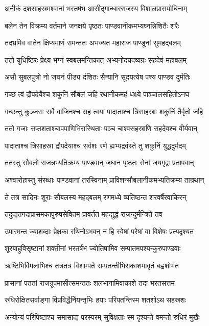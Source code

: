 \twolineshloka
{अनीकं दशसाहस्रमश्वानां भरतर्षभ}
{आसीद्गान्धारराजस्य विशालप्रासयोधिनाम्}


\twolineshloka
{बलेन तेन विक्रम्य वर्तमाने जनक्षये}
{पृष्ठतः पाण्डवानीकमभ्यघ्नन्निशितैः शरैः}


\twolineshloka
{तदभ्रमिव वातेन क्षिप्यमाणं समन्ततः}
{अभज्यत महाराज पाण्डूनां सुमहद्बलम्}


\twolineshloka
{ततो युधिष्ठिरः प्रेक्ष्य भग्नं स्वबलमन्तिकात्}
{अभ्यनोदयदव्यग्रः सहदेवं महाबलम्}


\twolineshloka
{असौ सुबलपुत्रो नो जघनं पीड्य दंशितः}
{सैन्यानि सूदयत्येष पश्य पाण्डव दुर्मतिः}


\twolineshloka
{गच्छ त्वं द्रौपदेयैश्च शकुनिं सौबलं जहि}
{रथानीकमहं धक्ष्ये पाञ्चालसहितोऽनघ}


\twolineshloka
{गच्छन्तु कुञ्जराः सर्वे वाजिनश्च सह त्वया}
{पादाताश्च त्रिसाहस्राः शकुनिं तैर्वृतो जहि}


\twolineshloka
{ततो गजाः सप्तशताश्चापपाणिभिरास्थिताः}
{पञ्च चाश्वसहस्राणि सहदेवश्च वीर्यवान्}


\twolineshloka
{पादाताश्च त्रिसाहस्रा द्रौपदेयाश्च सर्वशः}
{रणे ह्यभ्यद्रवंस्ते तु शकुनिं युद्धदुर्मदम्}


\twolineshloka
{ततस्तु सौबलो राजन्नभ्यतिक्रम्य पाण्डवान्}
{जघान पृष्ठतः सेनां जयगृद्वः प्रतापवान्}


\twolineshloka
{अश्वारोहास्तु संरब्धाः पाण्डवानां तरस्विनाम्}
{प्राविशन्सौबलानीकमभ्यतिक्रम्य तान्रथान्}


\twolineshloka
{ते तत्र सादिनः शूराः सौबलस्य महद्बलम्}
{रणमध्ये व्यतिष्ठन्त शरवर्षैरवाकिरन्}


\twolineshloka
{तदुद्यतगदाप्रासमकापुरुषसेवितम्}
{प्रावर्तत महद्युद्धं राजन्दुर्मन्त्रिते तव}


\twolineshloka
{उपारमन्त ज्याशब्दाः प्रेक्षका रथिनोऽभवन्}
{न हि स्वेषां परेषां वा विशेषः प्रत्यदृश्यत}


\twolineshloka
{शूरबाहुविसृष्टानां शक्तीनां भरतर्षभ}
{ज्योतिषामिव सम्पातमपश्यन्कुरुपाण्डवाः}


\twolineshloka
{ऋष्टिभिर्विमलाभिश्च तत्रतत्र विशाम्पते}
{सम्पतन्तीभिराकाशमावृतं बह्वशोभत}


\twolineshloka
{प्रासानां पततां राजन्रूपमासीत्समन्ततः}
{शलभानामिवाकाशे तदा भरतसत्तम}


\twolineshloka
{रुधिरोक्षितसर्वाङ्गा विप्रविद्धैर्नियन्तृभिः}
{हयाः परिपतन्तिस्म शतशोऽथ सहस्रशः}


\twolineshloka
{अन्योन्यं परिपिष्टाश्च समासाद्य परस्परम्}
{सुविक्षताः स्म दृश्यन्ते वमन्तो रुधिरं मुखैः}


